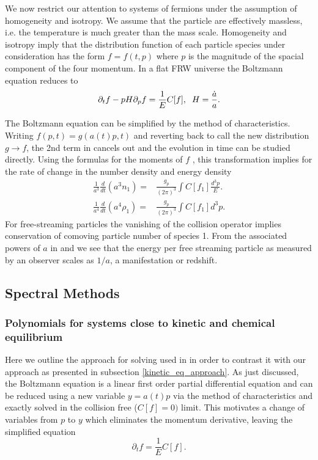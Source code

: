 We now restrict our attention to  systems of fermions under the assumption of homogeneity and isotropy. We assume that the particle are effectively massless,  i.e. the temperature is much greater than the mass scale.  Homogeneity and isotropy imply that the distribution function of each particle species under consideration has the form $f=f(t,p)$ where $p$ is the magnitude of the spacial component of the four momentum.  In a flat FRW universe the Boltzmann equation reduces to
\begin{equation}\label{boltzmann_p}
\partial_t f-pH \partial_p f=\frac{1}{E}C[f],\hspace{2mm} H=\frac{\dot{a}}{a}.
\end{equation}

The Boltzmann equation  can be simplified by the method of characteristics. Writing $f(p, t)=g(a(t)p,t)$ and reverting back to call the new distribution $g\to f$, the 2nd term in  cancels out and the evolution in time can be studied directly.  Using the formulas for the moments of $f$ , this transformation implies for the rate of change in the   number density and energy density  
\begin{align}\label{n_div}
\frac{1}{a^3}\frac{d}{dt}(a^3n_1)=&\frac{g_p}{(2\pi)^3}\int C[f_1] \frac{d^3p}{E}.\\
\label{rho_div}
\frac{1}{a^4}\frac{d}{dt}(a^4\rho_1)=&\frac{g_p}{(2\pi)^3}\int C[f_1] d^3p .
\end{align} 
For free-streaming particles the vanishing of the collision operator implies conservation of comoving particle number of species 1. From the associated powers of $a$ in  and  we see that the energy per free streaming particle as measured by an observer scales as $1/a$, a manifestation or redshift.

\subsection{Spectral Methods}\label{the_method}
\subsubsection{Polynomials for systems close to kinetic and chemical equilibrium}\label{free_stream_approach}
Here we outline the approach for solving  used in \cite{Esposito2000,Mangano2002} in order to contrast it with our approach as presented in subsection \ref{kinetic_eq_approach}.  As just discussed, the Boltzmann equation  is a linear first order partial differential equation and can be reduced using a new variable $y=a(t)p$  via the method of characteristics and exactly solved in the collision free ($C[f]=0)$ limit.   This motivates a change of variables from $p$ to $y$ which eliminates the momentum derivative, leaving the simplified equation
\begin{equation}\label{a_vars}
\partial_tf=\frac{1}{E} C[f].
\end{equation}

